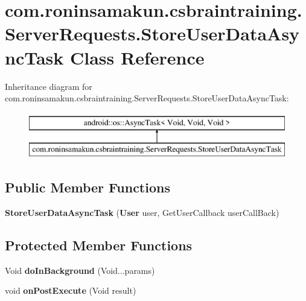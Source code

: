 \section{com.\+roninsamakun.\+csbraintraining.\+Server\+Requests.\+Store\+User\+Data\+Async\+Task Class Reference}
\label{classcom_1_1roninsamakun_1_1csbraintraining_1_1_server_requests_1_1_store_user_data_async_task}
Inheritance diagram for com.\+roninsamakun.\+csbraintraining.\+Server\+Requests.\+Store\+User\+Data\+Async\+Task\+:\begin{figure}[H]
\begin{center}
\leavevmode
\includegraphics[height=2.000000cm]{classcom_1_1roninsamakun_1_1csbraintraining_1_1_server_requests_1_1_store_user_data_async_task}
\end{center}
\end{figure}
\subsection*{Public Member Functions}
\begin{DoxyCompactItemize}
\item 
{\bfseries Store\+User\+Data\+Async\+Task} ({\bf User} user, Get\+User\+Callback user\+Call\+Back)\label{classcom_1_1roninsamakun_1_1csbraintraining_1_1_server_requests_1_1_store_user_data_async_task_a001af87c22ff549f3a025e8c795fe73a}

\end{DoxyCompactItemize}
\subsection*{Protected Member Functions}
\begin{DoxyCompactItemize}
\item 
Void {\bfseries do\+In\+Background} (Void...\+params)\label{classcom_1_1roninsamakun_1_1csbraintraining_1_1_server_requests_1_1_store_user_data_async_task_adbd03df9a8d098d53c60fe982d522d70}

\item 
void {\bfseries on\+Post\+Execute} (Void result)\label{classcom_1_1roninsamakun_1_1csbraintraining_1_1_server_requests_1_1_store_user_data_async_task_aba998e838fe71342ba29427e9852a833}

\end{DoxyCompactItemize}


